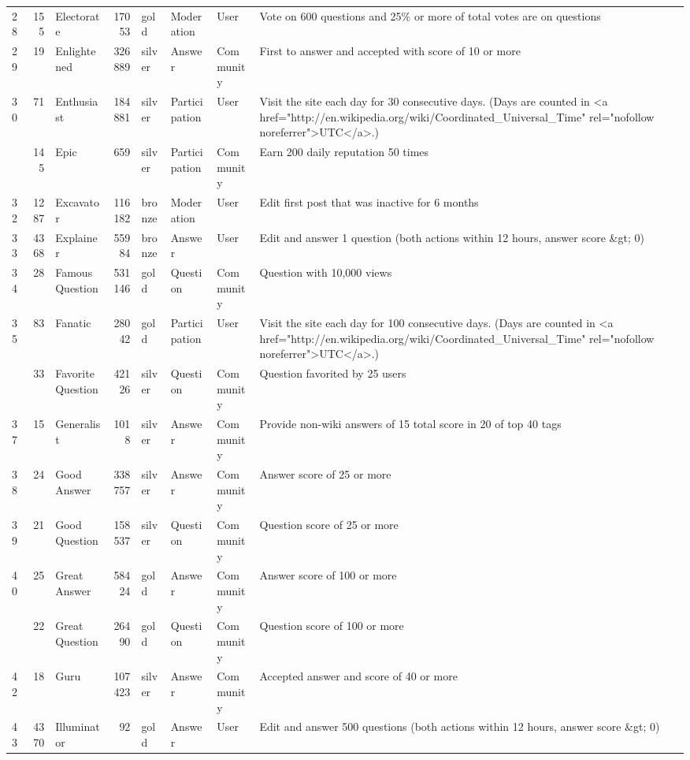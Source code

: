 \documentclass[]{book}
\theoremstyle{definition}
\theoremstyle{definition}
\theoremstyle{definition}
\theoremstyle{remark}
\begin{document}
\begin{landscape}
\begin{longtable}[t]{lr>{\raggedright\arraybackslash}p{2cm}rlll>{\raggedright\arraybackslash}p{10cm}}
28 & 155 & Electorate & 17053 & gold & Moderation & User & Vote on 600 questions and 25\% or more of total votes are on questions\\
29 & 19 & Enlightened & 326889 & silver & Answer & Community & First to answer and accepted with score of 10 or more\\
30 & 71 & Enthusiast & 184881 & silver & Participation & User & Visit the site each day for 30 consecutive days. (Days are counted in <a href="http://en.wikipedia.org/wiki/Coordinated\_Universal\_Time" rel="nofollow noreferrer">UTC</a>.)\\
\addlinespace
31 & 145 & Epic & 659 & silver & Participation & Community & Earn 200 daily reputation 50 times\\
32 & 1287 & Excavator & 116182 & bronze & Moderation & User & Edit first post that was inactive for 6 months\\
33 & 4368 & Explainer & 55984 & bronze & Answer & User & Edit and answer 1 question (both actions within 12 hours, answer score \&gt; 0)\\
34 & 28 & Famous Question & 531146 & gold & Question & Community & Question with 10,000 views\\
35 & 83 & Fanatic & 28042 & gold & Participation & User & Visit the site each day for 100 consecutive days. (Days are counted in <a href="http://en.wikipedia.org/wiki/Coordinated\_Universal\_Time" rel="nofollow noreferrer">UTC</a>.)\\
\addlinespace
36 & 33 & Favorite Question & 42126 & silver & Question & Community & Question favorited by 25 users\\
37 & 15 & Generalist & 1018 & silver & Answer & Community & Provide non-wiki answers of 15 total score in 20 of top 40 tags\\
38 & 24 & Good Answer & 338757 & silver & Answer & Community & Answer score of 25 or more\\
39 & 21 & Good Question & 158537 & silver & Question & Community & Question score of 25 or more\\
40 & 25 & Great Answer & 58424 & gold & Answer & Community & Answer score of 100 or more\\
\addlinespace
41 & 22 & Great Question & 26490 & gold & Question & Community & Question score of 100 or more\\
42 & 18 & Guru & 107423 & silver & Answer & Community & Accepted answer and score of 40 or more\\
43 & 4370 & Illuminator & 92 & gold & Answer & User & Edit and answer 500 questions (both actions within 12 hours, answer score \&gt; 0)\\

\end{longtable}
\end{landscape}
\end{document}
